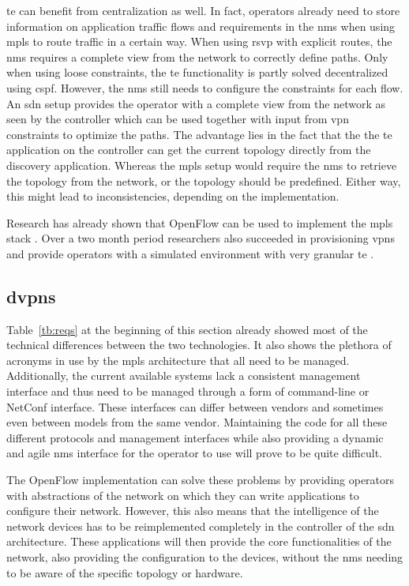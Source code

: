 \acl{te} can benefit from centralization as well. In fact, operators already need to store information on application traffic flows and requirements in the \ac{nms} when using \ac{mpls} to route traffic in a certain way. When using \ac{rsvp} with explicit routes, the \ac{nms} requires a complete view from the network to correctly define paths. Only when using loose constraints, the \ac{te} functionality is partly solved decentralized using \ac{cspf}. However, the \ac{nms} still needs to configure the constraints for each flow. An \ac{sdn} setup provides the operator with a complete view from the network as seen by the controller which can be used together with input from \ac{vpn} constraints to optimize the paths. The advantage lies in the fact that the the \ac{te} application on the controller can get the current topology directly from the discovery application. Whereas the \ac{mpls} setup would require the \ac{nms} to retrieve the topology from the network, or the topology should be predefined. Either way, this might lead to inconsistencies, depending on the implementation.

Research has already shown that OpenFlow can be used to implement the \ac{mpls} stack \cite{mpls-open}. Over a two month period researchers also succeeded in provisioning \acp{vpn} and provide operators with a simulated environment with very granular \ac{te} \cite{mpls-vpn-openflow}.




\subsection{\acp{dvpn}} %
\label{sub:dvpn}

Table~\ref{tb:reqs} at the beginning of this section already showed most of the technical differences between the two technologies. It also shows the plethora of acronyms in use by the \ac{mpls} architecture that all need to be managed. Additionally, the current available systems lack a consistent management interface and thus need to be managed through a form of command-line or NetConf interface. These interfaces can differ between vendors and sometimes even between models from the same vendor. Maintaining the code for all these different protocols and management interfaces while also providing a dynamic and agile \ac{nms} interface for the operator to use will prove to be quite difficult.

The OpenFlow implementation can solve these problems by providing operators with abstractions of the network on which they can write applications to configure their network. However, this also means that the intelligence of the network devices has to be reimplemented completely in the controller of the \ac{sdn} architecture. These applications will then provide the core functionalities of the network, also providing the configuration to the devices, without the \ac{nms} needing to be aware of the specific topology or hardware. 

